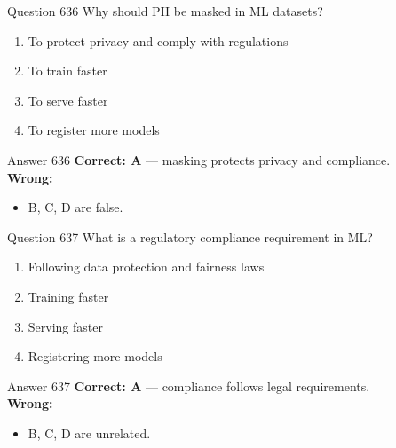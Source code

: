 \documentclass[aspectratio=169,11pt]{beamer}
\begin{document}
	\begin{frame}{Question 636}
		Why should PII be masked in ML datasets?
		\begin{enumerate}[label=\Alph*.]
			\item To protect privacy and comply with regulations
			\item To train faster
			\item To serve faster
			\item To register more models
		\end{enumerate}
	\end{frame}
	\begin{frame}{Answer 636}
		\textbf{Correct: A} --- masking protects privacy and compliance.\\
		\vspace{0.5em}
		\textbf{Wrong:}
		\begin{itemize}
			\item B, C, D are false.
		\end{itemize}
	\end{frame}
	
	\begin{frame}{Question 637}
		What is a regulatory compliance requirement in ML?
		\begin{enumerate}[label=\Alph*.]
			\item Following data protection and fairness laws
			\item Training faster
			\item Serving faster
			\item Registering more models
		\end{enumerate}
	\end{frame}
	\begin{frame}{Answer 637}
		\textbf{Correct: A} --- compliance follows legal requirements.\\
		\vspace{0.5em}
		\textbf{Wrong:}
		\begin{itemize}
			\item B, C, D are unrelated.
		\end{itemize}
	\end{frame}
	
\end{document}
